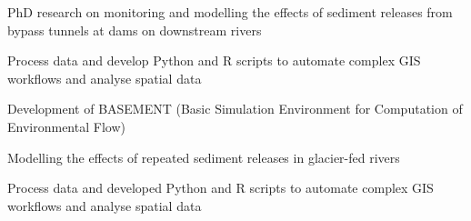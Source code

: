 \begin{tightemize}
\item PhD research on monitoring and modelling the effects of sediment releases from bypass tunnels at dams on downstream rivers
\item Process data and develop Python and R scripts to automate complex GIS workflows and analyse spatial data
\item Development of BASEMENT (Basic Simulation Environment for Computation of Environmental Flow)
\end{tightemize}
\sectionsep

\begin{tightemize}
\item Modelling the effects of repeated sediment releases in glacier-fed rivers
\item Process data and developed Python and R scripts to automate complex GIS workflows and analyse spatial data
\end{tightemize}
\sectionsep
